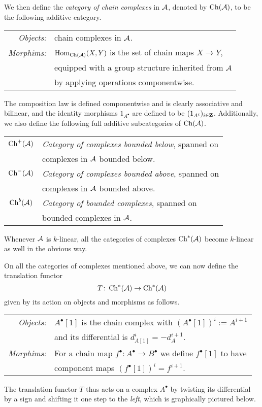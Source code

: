 We then define the \emph{category of chain complexes} in $\mathcal A$, denoted by $\operatorname{Ch}(\mathcal A)$, to be the following additive category. 
\begin{center}
    \begin{tabular}{r l}
        \textsl{Objects:} & chain complexes in $\mathcal A$. \\
        \textsl{Morphims:} & $\operatorname{Hom}_{\operatorname{Ch}(\mathcal A)}(X, Y)$ is the set of chain maps $X \to Y$, \\ & equipped with a group structure inherited from $\mathcal A$ \\ & by applying operations componentwise.
    \end{tabular}
\end{center}
The composition law is defined componentwise and is clearly associative and bilinear, and the identity morphisms $1_{A^\bullet}$ are defined to be $(1_{A^i})_{i \in \mathbf Z}$. Additionally, we also define the following full additive subcategories of $\operatorname{Ch}(\mathcal A)$.
\begin{center}
    \begin{tabular}{c l}
        $\operatorname{Ch}^+(\mathcal A)$ & \emph{Category of complexes bounded below}, spanned on \\ &complexes in $\mathcal A$ bounded below. \\
        $\operatorname{Ch}^-(\mathcal A)$ & \emph{Category of complexes bounded above}, spanned on \\ &complexes in $\mathcal A$ bounded above. \\
        $\operatorname{Ch}^b(\mathcal A)$ & \emph{Category of bounded complexes}, spanned on \\ &bounded complexes in $\mathcal A$. \\    
    \end{tabular}
\end{center}
\begin{remark}
    Whenever $\mathcal A$ is $k$-linear, all the categories of complexes $\operatorname{Ch}^*(\mathcal A)$ become $k$-linear as well in the obvious way.
\end{remark}

On all the categories of complexes mentioned above, we can now define the translation functor
\[
    T\colon \operatorname{Ch}^*(\mathcal A) \to \operatorname{Ch}^*(\mathcal A)
\]  
given by its action on objects and morphisms as follows.

\begin{center}
    \begin{tabular}{r l}
        \textsl{Objects:} & $A^\bullet[1]$ is the chain complex with $(A^\bullet[1])^i := A^{i+1}$ \\ & and its differential is $d^i_{A[1]} = - d^{i+1}_{A}$. \\
        \textsl{Morphims:} & For a chain map $f^\bullet\colon A^\bullet \to B^\bullet$ we define $f^\bullet[1]$ to have \\ & component maps $(f^\bullet[1])^i = f^{i+1}$.
    \end{tabular}
\end{center}
The translation functor $T$ thus acts on a complex $A^\bullet$ by twisting its differential by a sign and shifting it one step to the \emph{left}, which is graphically pictured below.

